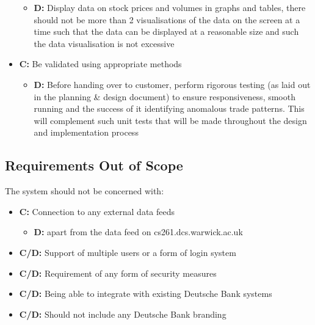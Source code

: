 \documentclass[11pt, oneside, a4paper]{article}
\begin{document}
\begin{itemize}
	\begin{itemize}
		\item \textbf{D:} Display data on stock prices and volumes in graphs and tables, there should not be more than 2 visualisations of the data on the screen at a time such that the data can be displayed at a reasonable size and such the data visualisation is not excessive
	\end{itemize}
	\item \textbf{C:} Be validated using appropriate methods
	\begin{itemize}
		\item \textbf{D:} Before handing over to customer, perform rigorous testing (as laid out in the planning \& design document) to ensure responsiveness, smooth running and the success of it identifying anomalous trade patterns. This will complement such unit tests that will be made throughout the design and implementation process
	\end{itemize}
\end{itemize}

\subsection{Requirements Out of Scope}
The system should not be concerned with:
\begin{itemize}
	\item \textbf{C:} Connection to any external data feeds
	\begin{itemize}
		\item \textbf{D:} apart from the data feed on cs261.dcs.warwick.ac.uk
	\end{itemize}
	\item \textbf{C/D:} Support of multiple users or a form of login system
	\item \textbf{C/D:} Requirement of any form of security measures
	\item \textbf{C/D:} Being able to integrate with existing Deutsche Bank systems
	\item \textbf{C/D:} Should not include any Deutsche Bank branding
\end{itemize}
\end{document}
